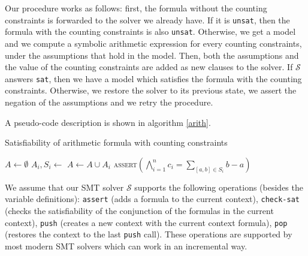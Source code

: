Our procedure works as follows: first, the formula without the
counting constraints is forwarded to the solver we already have. If it
is \texttt{unsat}, then the formula with the counting constraints is
also \texttt{unsat}. Otherwise, we get a model and we compute a
symbolic arithmetic expression for every counting constraints, under
the assumptions that hold in the model. Then, both the assumptions and
the value of the counting constraints are added as new clauses to the
solver. If $\mathcal{S}$ answers \texttt{sat}, then we have a model
which satisfies the formula with the counting constraints. Otherwise,
we restore the solver to its previous state, we assert the negation of
the assumptions and we retry the procedure.

A pseudo-code description is shown in algorithm \ref{arith}.

\begin{algorithm}[h]
\caption{Satisfiability of arithmetic formula with counting constraints}\label{arith}
\begin{algorithmic}[1]
\State {}
    \State {}
    \State $A \gets \emptyset$
        \State $A_i, S_i \gets $ 
        \State $A \gets A \cup A_i$
            \State {}
            \State {}
        \EndIf
    \EndFor
    \State {}
    \State \textsc{assert}$\left(\bigwedge\limits_{i=1}^n c_i = \sum\limits_{[a, b] \in S_i} b - a\right)$
        \State {}
        \State {}
    \EndIf
    \State {}
    \State {}
\EndWhile
\State {}
\end{algorithmic}
\label{arith}
\end{algorithm}

We assume that our SMT solver $\mathcal{S}$ supports the following operations (besides the variable definitions):
\texttt{assert} (adds a formula to the current context),
\texttt{check-sat} (checks the satisfiability of the conjunction of the
formulas in the current context), \texttt{push} (creates a new context
with the current context formula), \texttt{pop} (restores the context to
the last \texttt{push} call). These operations are supported by most
modern SMT solvers which can work in an incremental way.


